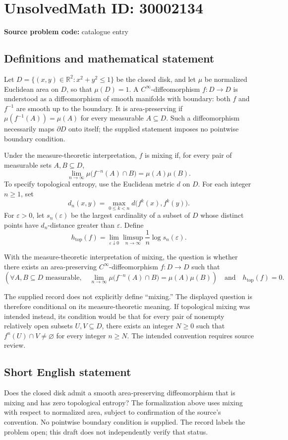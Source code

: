 \documentclass[11pt]{article}
\newcommand{\R}{\mathbb{R}}
\begin{document}
\section*{UnsolvedMath ID: 30002134}
\textbf{Source problem code:} catalogue entry
\subsection{Definitions and mathematical statement}
Let \(D=\{(x,y)\in\R^2:x^2+y^2\leq 1\}\) be the closed disk, and let \(\mu\) be normalized Euclidean area on \(D\), so that \(\mu(D)=1\). A \(C^\infty\)-diffeomorphism \(f:D\to D\) is understood as a diffeomorphism of smooth manifolds with boundary: both \(f\) and \(f^{-1}\) are smooth up to the boundary. It is area-preserving if \(\mu(f^{-1}(A))=\mu(A)\) for every measurable \(A\subseteq D\). Such a diffeomorphism necessarily maps \(\partial D\) onto itself; the supplied statement imposes no pointwise boundary condition.

Under the measure-theoretic interpretation, \(f\) is mixing if, for every pair of measurable sets \(A,B\subseteq D\),
\[
\lim_{n\to\infty}\mu\bigl(f^{-n}(A)\cap B\bigr)=\mu(A)\mu(B).
\]
To specify topological entropy, use the Euclidean metric \(d\) on \(D\). For each integer \(n\geq1\), set
\[
d_n(x,y)=\max_{0\leq k<n}d\bigl(f^k(x),f^k(y)\bigr).
\]
For \(\varepsilon>0\), let \(s_n(\varepsilon)\) be the largest cardinality of a subset of \(D\) whose distinct points have \(d_n\)-distance greater than \(\varepsilon\). Define
\[
h_{\mathrm{top}}(f)=\lim_{\varepsilon\downarrow0}\limsup_{n\to\infty}\frac{1}{n}\log s_n(\varepsilon).
\]

With the measure-theoretic interpretation of mixing, the question is whether there exists an area-preserving \(C^\infty\)-diffeomorphism \(f:D\to D\) such that
\[
\left(\forall A,B\subseteq D\text{ measurable},\quad
\lim_{n\to\infty}\mu\bigl(f^{-n}(A)\cap B\bigr)=\mu(A)\mu(B)\right)
\quad\text{and}\quad h_{\mathrm{top}}(f)=0.
\]

The supplied record does not explicitly define ``mixing.'' The displayed question is therefore conditional on its measure-theoretic meaning. If topological mixing was intended instead, its condition would be that for every pair of nonempty relatively open subsets \(U,V\subseteq D\), there exists an integer \(N\geq0\) such that \(f^n(U)\cap V\neq\varnothing\) for every integer \(n\geq N\). The intended convention requires source review.
\subsection{Short English statement}
Does the closed disk admit a smooth area-preserving diffeomorphism that is mixing and has zero topological entropy? The formalization above uses mixing with respect to normalized area, subject to confirmation of the source's convention. No pointwise boundary condition is supplied. The record labels the problem open; this draft does not independently verify that status.
\end{document}
